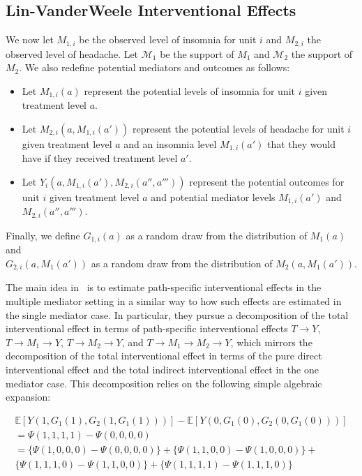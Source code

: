 \subsection{Lin-VanderWeele Interventional Effects}

We now let $M_{1,i}$ be the observed level of insomnia for unit $i$ and $M_{2,i}$ the observed level of
headache. Let $\mathcal{M}_{1}$ be the support of $M_{1}$ and $\mathcal{M}_{2}$ the support of $M_{2}$. 
We also redefine potential mediators and outcomes as follows:

\begin{itemize}[noitemsep,topsep=0pt]
	\item Let $M_{1,i}(a)$ represent the potential levels of insomnia for unit $i$ given 
	treatment level $a$. 
	\item Let $M_{2,i}(a,M_{1,i}(a'))$ represent the potential levels of headache for unit $i$ given 
	treatment level $a$ and an insomnia level $M_{1,i}(a')$ that they would have if they received 
	treatment level $a'$. 
	\item Let $Y_{i}(a,M_{1,i}(a'),M_{2,i}(a'',a'''))$ represent the potential outcomes 
	for unit $i$ given treatment level $a$ and potential mediator levels $M_{1,i}(a')$ and 
	$M_{2,i}(a'',a''')$. 
\end{itemize}

Finally, we define $G_{1,i}(a)$ as a random draw from the distribution of $M_{1}(a)$ 
and\\ $G_{2,i}(a,M_{1}(a'))$ as a random draw from the distribution of $M_{2}(a,M_{1}(a'))$. 

The main idea in~\cite{linvanderweele2017} is to estimate
path-specific interventional effects in the multiple mediator setting in a similar way to how 
such effects are estimated in the single mediator case. In particular, they pursue a decomposition
of the total interventional effect in terms of path-specific interventional effects 
$T \rightarrow Y$, $T \rightarrow M_{1} \rightarrow Y$, $T \rightarrow M_{2} \rightarrow Y$, 
and $T \rightarrow M_{1} \rightarrow M_{2} \rightarrow Y$, which mirrors the decomposition of 
the total interventional effect in terms of the pure direct interventional effect and the total 
indirect interventional effect in the one mediator case. This decomposition relies on the following
simple algebraic expansion: 

\begin{equation}
\begin{aligned}
	\mathbb{E}[Y(1,G_{1}(1),G_{2}(1,G_{1}(1)))] - 
	\mathbb{E}[Y(0,G_{1}(0),G_{2}(0,G_{1}(0)))]\\ 
	= \Psi(1,1,1,1) - \Psi(0,0,0,0)\\
	= \{\Psi(1,0,0,0) - \Psi(0,0,0,0)\} + \{\Psi(1,1,0,0) - \Psi(1,0,0,0)\} +\\ 
	\{\Psi(1,1,1,0) - \Psi(1,1,0,0)\} + \{\Psi(1,1,1,1) - \Psi(1,1,1,0)\}
\end{aligned}
\end{equation}

